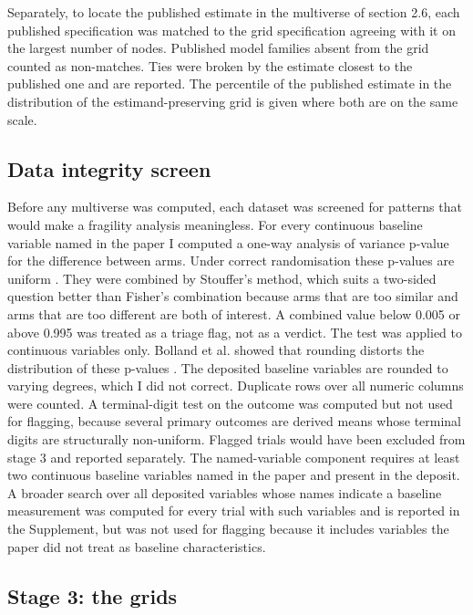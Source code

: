 Separately, to locate the published estimate in the multiverse of section 2.6, each published specification was matched to the grid specification agreeing with it on the largest number of nodes. Published model families absent from the grid counted as non-matches. Ties were broken by the estimate closest to the published one and are reported. The percentile of the published estimate in the distribution of the estimand-preserving grid is given where both are on the same scale.

\subsection{Data integrity screen}\label{data-integrity-screen}

Before any multiverse was computed, each dataset was screened for patterns that would make a fragility analysis meaningless. For every continuous baseline variable named in the paper I computed a one-way analysis of variance p-value for the difference between arms. Under correct randomisation these p-values are uniform \cite{Carlisle_2017}. They were combined by Stouffer's method, which suits a two-sided question better than Fisher's combination because arms that are too similar and arms that are too different are both of interest. A combined value below 0.005 or above 0.995 was treated as a triage flag, not as a verdict. The test was applied to continuous variables only. Bolland et al. showed that rounding distorts the distribution of these p-values \cite{Bolland_2019}. The deposited baseline variables are rounded to varying degrees, which I did not correct. Duplicate rows over all numeric columns were counted. A terminal-digit test on the outcome was computed but not used for flagging, because several primary outcomes are derived means whose terminal digits are structurally non-uniform. Flagged trials would have been excluded from stage 3 and reported separately. The named-variable component requires at least two continuous baseline variables named in the paper and present in the deposit. A broader search over all deposited variables whose names indicate a baseline measurement was computed for every trial with such variables and is reported in the Supplement, but was not used for flagging because it includes variables the paper did not treat as baseline characteristics.

\subsection{Stage 3: the grids}\label{stage-3-the-grids}

